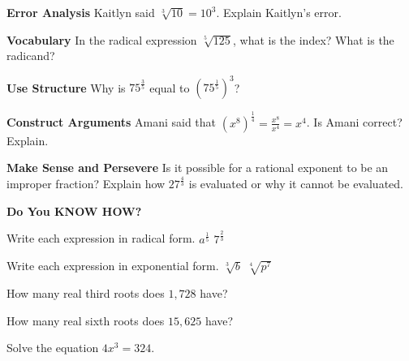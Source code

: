 \documentclass{article}
\newenvironment{practice}[2]{}{}
\begin{document}
\begin{practice}{2}{}
\textbf{Error Analysis} Kaitlyn said $\sqrt[3]{10} = 10^3$. Explain Kaitlyn's error.
\end{practice}

\begin{practice}{3}{}
\textbf{Vocabulary} In the radical expression $\sqrt[5]{125}$, what is the index? What is the radicand?
\end{practice}

\begin{practice}{4}{}
\textbf{Use Structure} Why is $75^{\frac{3}{5}}$ equal to $(75^{\frac{1}{5}})^3$?
\end{practice}

\begin{practice}{5}{}
\textbf{Construct Arguments} Amani said that $(x^8)^{\frac{1}{4}} = \frac{x^8}{x^4} = x^4$. Is Amani correct? Explain.
\end{practice}

\begin{practice}{6}{}
\textbf{Make Sense and Persevere} Is it possible for a rational exponent to be an improper fraction? Explain how $27^{\frac{4}{3}}$ is evaluated or why it cannot be evaluated.
\end{practice}

\textbf{Do You KNOW HOW?}

Write each expression in radical form.
\begin{practice}{7}{}
$a^{\frac{1}{5}}$
\end{practice}
\begin{practice}{8}{}
$7^{\frac{2}{3}}$
\end{practice}

Write each expression in exponential form.
\begin{practice}{9}{}
$\sqrt[3]{b}$
\end{practice}
\begin{practice}{10}{}
$\sqrt[4]{p^7}$
\end{practice}

\begin{practice}{11}{}
How many real third roots does $1,728$ have?
\end{practice}

\begin{practice}{12}{}
How many real sixth roots does $15,625$ have?
\end{practice}

\begin{practice}{13}{}
Solve the equation $4x^3 = 324$.
\end{practice}
\end{document}
